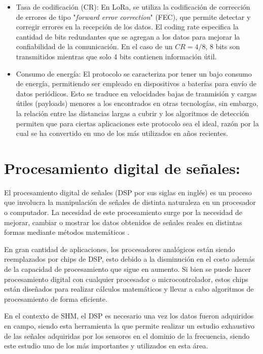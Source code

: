 \begin{itemize}
    \item Tasa de codificación (CR): En LoRa, se utiliza la codificación de corrección de errores de tipo "\textit{forward error correction}" (FEC), que permite detectar y corregir errores en la recepción de los datos. El coding rate especifica la cantidad de bits redundantes que se agregan a los datos para mejorar la confiabilidad de la comunicación. En el caso de un $CR = 4 / 8$, 8 bits son transmitidos mientras que solo 4 bits contienen información útil.
    
    
    \item Consumo de energía: El protocolo se caracteriza por tener un bajo consumo de energía, permitiendo ser empleado en dispositivos a baterías para envío de datos periódicos. Esto se traduce en velocidades bajas de tranmisión y cargas útiles (payloads) menores a los encontrados en otras tecnologías, sin embargo, la relación entre las distancias largas a cubrir y los algoritmos de detección permiten que para ciertas aplicaciones este protocolo sea el ideal, razón por la cual se ha convertido en uno de los más utilizados en años recientes.
\end{itemize}

\section{Procesamiento digital de señales:}

El procesamiento digital de señales (DSP por sus siglas en inglés) es un proceso que involucra la manipulación de señales de distinta naturaleza en un procesador o computador. La necesidad de este procesamiento surge por la necesidad de mejorar, cambiar o mostrar los datos obtenidos de señales reales en distintas formas mediante métodos matemáticos \citep{proakisDSP}.

En gran cantidad de aplicaciones, los procesadores analógicos están siendo reemplazados por chips de DSP, esto debido a la disminución en el costo además de la capacidad de procesamiento que sigue en aumento. Si bien se puede hacer procesamiento digital con cualquier procesador o microcontrolador, estos chips están diseñados para realizar cálculos matemáticos y llevar a cabo algoritmos de procesamiento de forma eficiente. 

En el contexto de SHM, el DSP es necesario una vez los datos fueron adquiridos en campo, siendo esta herramienta la que permite realizar un estudio exhaustivo de las señales adquiridas por los sensores en el dominio de la frecuencia, siendo este estudio uno de los más importantes y utilizados en esta área.

